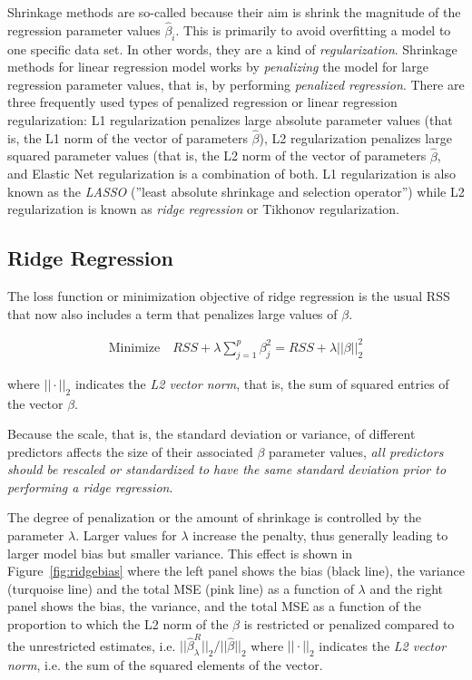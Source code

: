Shrinkage methods are so-called because their aim is shrink the magnitude of the regression parameter values $\hat{\beta}_i$. This is primarily to avoid overfitting a model to one specific data set. In other words, they are a kind of \emph{regularization}. Shrinkage methods for linear regression model works by \emph{penalizing} the model for large regression parameter values, that is, by performing \emph{penalized regression}. There are three frequently used types of penalized regression or linear regression regularization: L1 regularization penalizes large absolute parameter values (that is, the L1 norm of the vector of parameters $\hat{\beta}$), L2 regularization penalizes large squared parameter values (that is, the L2 norm of the vector of parameters $\hat{\beta}$, and Elastic Net regularization is a combination of both. L1 regularization is also known as the \emph{LASSO} (''least absolute shrinkage and selection operator'') while L2 regularization is known as \emph{ridge regression} or Tikhonov regularization. 

\subsection{Ridge Regression}

The loss function or minimization objective of ridge regression is the usual RSS that now also includes a term that penalizes large values of $\beta$. 

\begin{align*}
\text{Minimize} \quad RSS + \lambda \sum_{j=1}^p \beta_j^2 = RSS + \lambda ||\beta||_2^2
\end{align*}

\noindent where $||\cdot||_2$ indicates the \emph{L2 vector norm}, that is, the sum of squared entries of the vector $\beta$. 

Because the scale, that is, the standard deviation or variance, of different predictors affects the size of their associated $\beta$ parameter values, \emph{all predictors should be rescaled or standardized to have the same standard deviation prior to performing a ridge regression}. 

The degree of penalization or the amount of shrinkage is controlled by the parameter $\lambda$. Larger values for $\lambda$ increase the penalty, thus generally leading to larger model bias but smaller variance. This effect is shown in Figure~\ref{fig:ridgebias} where the left panel shows the bias (black line), the variance (turquoise line) and the total MSE (pink line) as a function of $\lambda$ and the right panel shows the bias, the variance, and the total MSE as a function of the proportion to which the L2 norm of the $\beta$ is restricted or penalized compared to the unrestricted estimates, i.e. $||\hat{\beta}^R_\lambda||_2 / ||\hat{\beta}||_2$ where $||\cdot||_2$ indicates the \emph{L2 vector norm}, i.e. the sum of the squared elements of the vector.

